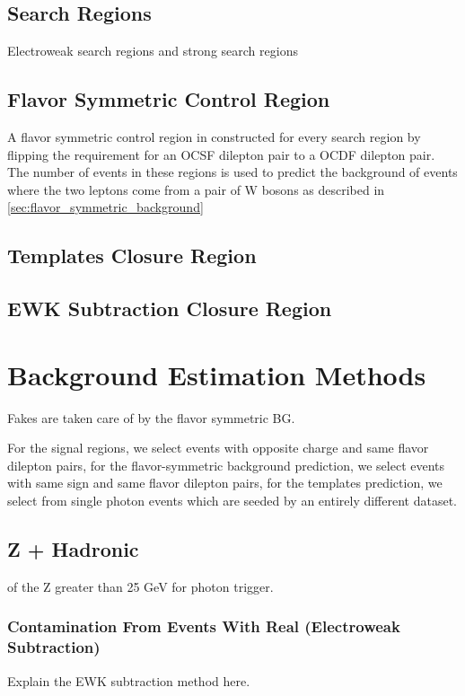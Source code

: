   \subsection{Search Regions}
    Electroweak search regions and strong search regions

  \subsection{Flavor Symmetric Control Region} \label{sec:flavor_symmetric_control_region}
    A flavor symmetric control region in constructed for every search region by flipping the requirement for an OCSF dilepton pair to a OCDF dilepton pair. The number of events in these regions is used to predict the background of events where the two leptons come from a pair of W bosons as described in \ref{sec:flavor_symmetric_background}

  \subsection{\MET Templates Closure Region} \label{sec:met_templates_control_region}

  \subsection{EWK Subtraction Closure Region} \label{sec:ewk_subtraction_closure_region}



\section{Background Estimation Methods} \label{sec:background_estimation_methods}
  Fakes are taken care of by the flavor symmetric BG.

  For the signal regions, we select events with opposite charge and same flavor dilepton pairs, for the flavor-symmetric background prediction, we select events with same sign and same flavor dilepton pairs, for the \MET templates prediction, we select from single photon events which are seeded by an entirely different dataset.

  \subsection{Z + Hadronic} \label{sec:z_+_hadronic}
  \pt of the Z greater than 25 GeV for photon trigger.
    
    \subsubsection{Contamination From Events With Real \MET (Electroweak Subtraction)} \label{sec:ewk_subtraction}
      Explain the EWK subtraction method here.


